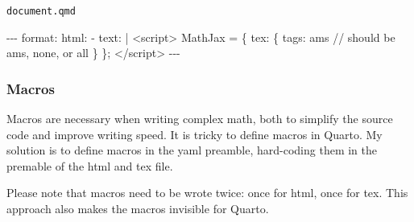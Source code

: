 \documentclass[
  letterpaper,
  DIV=11,
  numbers=noendperiod]{scrartcl}
\newenvironment{Shaded}{\begin{snugshade}}{\end{snugshade}}
\newcommand{\AttributeTok}[1]{\textcolor[rgb]{0.40,0.45,0.13}{#1}}
\newcommand{\CharTok}[1]{\textcolor[rgb]{0.13,0.47,0.30}{#1}}
\newcommand{\FunctionTok}[1]{\textcolor[rgb]{0.28,0.35,0.67}{#1}}
\newcommand{\KeywordTok}[1]{\textcolor[rgb]{0.00,0.23,0.31}{#1}}
\newcommand{\NormalTok}[1]{\textcolor[rgb]{0.00,0.23,0.31}{#1}}
\newcommand{\PreprocessorTok}[1]{\textcolor[rgb]{0.68,0.00,0.00}{#1}}
\theoremstyle{plain}
\theoremstyle{remark}
\begin{document}
\begin{codelisting}

\caption{\texttt{document.qmd}}

\begin{Shaded}
\begin{Highlighting}[]
\PreprocessorTok{{-}{-}{-}}
\FunctionTok{format}\KeywordTok{:}
\AttributeTok{  }\FunctionTok{html}\KeywordTok{:}
\KeywordTok{        {-} }\FunctionTok{text}\KeywordTok{:}\AttributeTok{ }\CharTok{|}
\NormalTok{            \textless{}script\textgreater{}}
\NormalTok{            MathJax = \{}
\NormalTok{                tex: \{}
\NormalTok{                    tags: \textquotesingle{}ams\textquotesingle{}  // should be \textquotesingle{}ams\textquotesingle{}, \textquotesingle{}none\textquotesingle{}, or \textquotesingle{}all\textquotesingle{}}
\NormalTok{                \}}
\NormalTok{            \};}
\NormalTok{            \textless{}/script\textgreater{}}
\PreprocessorTok{{-}{-}{-}}
\end{Highlighting}
\end{Shaded}

\end{codelisting}

\hypertarget{macros}{%
\subsubsection{Macros}\label{macros}}

Macros are necessary when writing complex math, both to simplify the
source code and improve writing speed. It is tricky to define macros in
Quarto. My solution is to define macros in the yaml preamble,
hard-coding them in the premable of the html and tex file.

Please note that macros need to be wrote twice: once for html, once for
tex. This approach also makes the macros invisible for Quarto.
\end{document}

